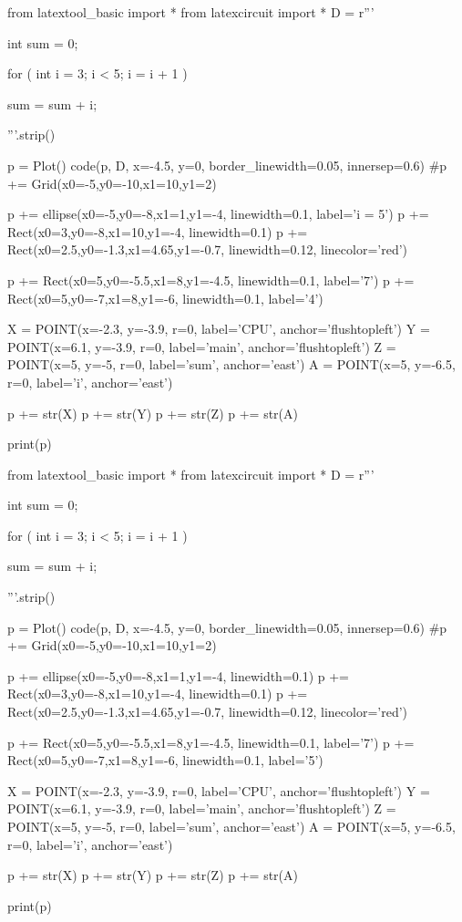 \begin{python}
from latextool_basic import *
from latexcircuit import *
D = r'''



int sum = 0;

    for ( int i = 3;     i < 5;     i = i + 1 )


        sum = sum + i;



'''.strip()

p = Plot()
code(p, D, x=-4.5, y=0, border_linewidth=0.05, innersep=0.6)
#p += Grid(x0=-5,y0=-10,x1=10,y1=2)

p += ellipse(x0=-5,y0=-8,x1=1,y1=-4, linewidth=0.1, label='i = 5')
p += Rect(x0=3,y0=-8,x1=10,y1=-4, linewidth=0.1)
p += Rect(x0=2.5,y0=-1.3,x1=4.65,y1=-0.7, linewidth=0.12, linecolor='red')

p += Rect(x0=5,y0=-5.5,x1=8,y1=-4.5, linewidth=0.1, label='7')
p += Rect(x0=5,y0=-7,x1=8,y1=-6, linewidth=0.1, label='4')

X = POINT(x=-2.3, y=-3.9, r=0, label='CPU', anchor='flushtopleft')
Y = POINT(x=6.1, y=-3.9, r=0, label='main', anchor='flushtopleft')
Z = POINT(x=5, y=-5, r=0, label='sum', anchor='east')
A = POINT(x=5, y=-6.5, r=0, label='i', anchor='east')

p += str(X)
p += str(Y)
p += str(Z)
p += str(A)

print(p)
\end{python}

\begin{python}
from latextool_basic import *
from latexcircuit import *
D = r'''



int sum = 0;

    for ( int i = 3;     i < 5;     i = i + 1 )


        sum = sum + i;



'''.strip()

p = Plot()
code(p, D, x=-4.5, y=0, border_linewidth=0.05, innersep=0.6)
#p += Grid(x0=-5,y0=-10,x1=10,y1=2)

p += ellipse(x0=-5,y0=-8,x1=1,y1=-4, linewidth=0.1)
p += Rect(x0=3,y0=-8,x1=10,y1=-4, linewidth=0.1)
p += Rect(x0=2.5,y0=-1.3,x1=4.65,y1=-0.7, linewidth=0.12, linecolor='red')

p += Rect(x0=5,y0=-5.5,x1=8,y1=-4.5, linewidth=0.1, label='7')
p += Rect(x0=5,y0=-7,x1=8,y1=-6, linewidth=0.1, label='5')

X = POINT(x=-2.3, y=-3.9, r=0, label='CPU', anchor='flushtopleft')
Y = POINT(x=6.1, y=-3.9, r=0, label='main', anchor='flushtopleft')
Z = POINT(x=5, y=-5, r=0, label='sum', anchor='east')
A = POINT(x=5, y=-6.5, r=0, label='i', anchor='east')

p += str(X)
p += str(Y)
p += str(Z)
p += str(A)

print(p)
\end{python}

